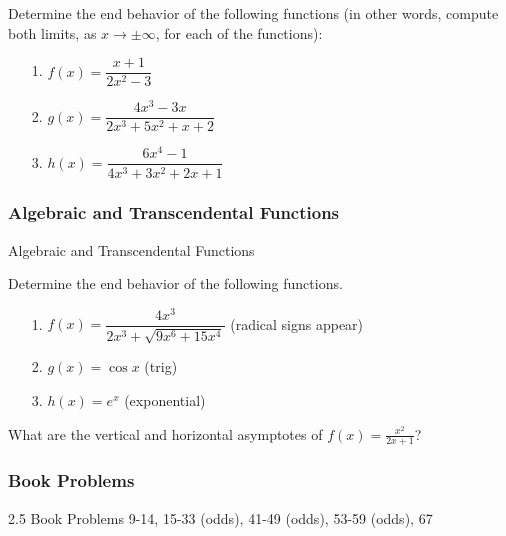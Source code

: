 \documentclass[Cal1Spr16Lectures.tex]{subfiles}
\begin{document}
\begin{frame}%
\begin{exe} Determine the \alert{end behavior} of the following functions (in other words, compute both limits, as $x\to\pm\infty$, for each of the functions):
\begin{itemize}
\item[1.\;] $f(x)=\dfrac{x+1}{2x^2-3}$
\item[2.\;] $g(x)=\dfrac{4x^3-3x}{2x^3+5x^2+x+2}$
\item[3.\;] $h(x)=\dfrac{6x^4-1}{4x^3+3x^2+2x+1}$
\end{itemize}
\end{exe}
\end{frame}

\subsubsection{Algebraic and Transcendental Functions}
\begin{frame}{\small Algebraic and Transcendental Functions}
\begin{ex} Determine the end behavior of the following functions.
\begin{itemize}
\item[1.] $f(x) = \dfrac{4x^3}{2x^3+\sqrt{9x^6+15x^4}}$ (radical signs appear)

\vspace{1pc}
\item[2.] $g(x)=\cos x$ (trig)

\vspace{1pc}
\item[3.] $h(x)=e^x$ (exponential)
\end{itemize}
\end{ex}
\end{frame}

\begin{frame}
\begin{exe}
What are the vertical and horizontal asymptotes of $f(x)=\frac{x^2}{2x+1}$?
\end{exe}
\end{frame}

\subsubsection{Book Problems}
\begin{frame}
\begin{block}{2.5 Book Problems} 9-14, 15-33 (odds), 41-49 (odds), 53-59 (odds), 67  \end{block} 
\end{frame}
\end{document}

